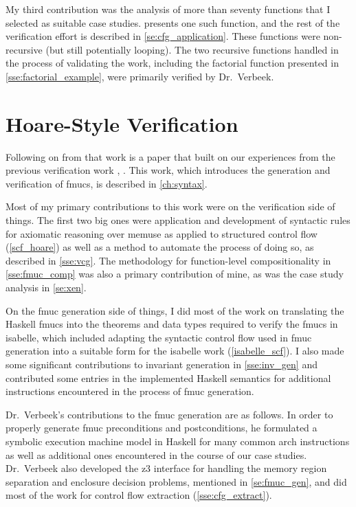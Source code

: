 My third contribution was the analysis of more than seventy functions that I selected as suitable case studies.
 presents one such function,
and the rest of the verification effort is described in \cref{se:cfg_application}.
These functions were non-recursive (but still potentially looping).
The two recursive functions handled in the process of validating the work,
including the factorial function presented in \cref{sse:factorial_example},
were primarily verified by Dr.~Verbeek.

\section*{Hoare-Style Verification}
\label{attribute2}
Following on from that work is a paper that built on our experiences from the previous verification work \autocite{verbeek2020automated}, .
This work, which introduces the generation and verification of \glspl{fmuc}, is described in \cref{ch:syntax}.

Most of my primary contributions to this work were on the verification side of things.
The first two big ones were application and development of syntactic rules
for axiomatic reasoning over \gls{memuse}
as applied to structured control flow (\cref{scf_hoare})
as well as a method to automate the process of doing so, 
as described in \cref{sse:vcg}.
The methodology for function-level compositionality in \cref{sse:fmuc_comp}
was also a primary contribution of mine,
as was the case study analysis in \cref{se:xen}.

On the \gls{fmuc} generation side of things,
I did most of the work on translating the Haskell \glspl{fmuc}
into the theorems and data types required to verify the \glspl{fmuc} in \gls{isabelle},
which included adapting the syntactic control flow used in \gls{fmuc} generation
into a suitable form for the \gls{isabelle} work (\cref{isabelle_scf}).
I also made some significant contributions to invariant generation in \cref{sse:inv_gen} and contributed some entries in the implemented Haskell semantics for additional instructions encountered in the process of \gls{fmuc} generation.

Dr.~Verbeek's contributions to the \gls{fmuc} generation are as follows.
In order to properly generate \gls{fmuc} preconditions and postconditions,
he formulated a symbolic execution machine model in Haskell for many common \gls{arch} instructions as well as additional ones encountered in the course of our case studies.
Dr.~Verbeek also developed the \gls{z3} \autocite{de2008z3} interface
for handling the memory region separation and enclosure decision problems,
mentioned in \cref{se:fmuc_gen},
and did most of the work for control flow extraction (\cref{sse:cfg_extract}).

